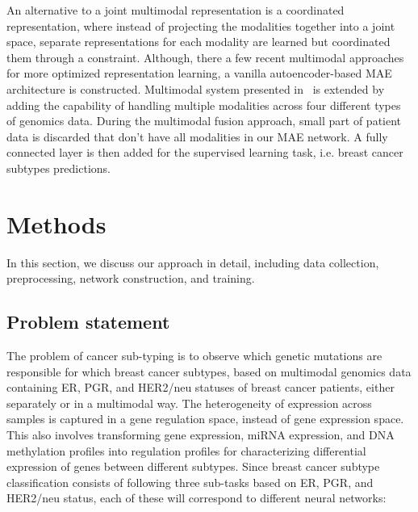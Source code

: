 \hspace*{3.5mm} An alternative to a joint multimodal representation is a coordinated representation, where instead of projecting the modalities together into a joint space, separate representations for each modality are learned but coordinated them through a constraint. Although, there a few recent multimodal approaches for more optimized representation learning, a vanilla autoencoder-based MAE architecture is constructed. Multimodal system presented in~\cite{wang2018associativemulti} is extended by adding the capability of handling multiple modalities across four different types of genomics data. During the multimodal fusion approach, small part of patient data is discarded that don't have all modalities in our MAE network. A fully connected layer is then added for the supervised learning task, i.e. breast cancer subtypes predictions. 


\section{Methods}\label{chapter_4:mm}
In this section, we discuss our approach in detail, including data collection, preprocessing, network construction, and training. 

\subsection{Problem statement}
The problem of cancer sub-typing is to observe which genetic mutations are responsible for which breast cancer subtypes, based on multimodal genomics data containing ER, PGR, and HER2/neu statuses of breast cancer patients, either separately or in a multimodal way. 
The heterogeneity of expression across samples is captured in a gene regulation space, instead of gene expression space. This also involves transforming gene expression, miRNA expression, and DNA methylation profiles into regulation profiles for characterizing differential expression of genes between different subtypes. Since breast cancer subtype classification consists of following three sub-tasks based on ER, PGR, and HER2/neu status, each of these will correspond to different neural networks: 

